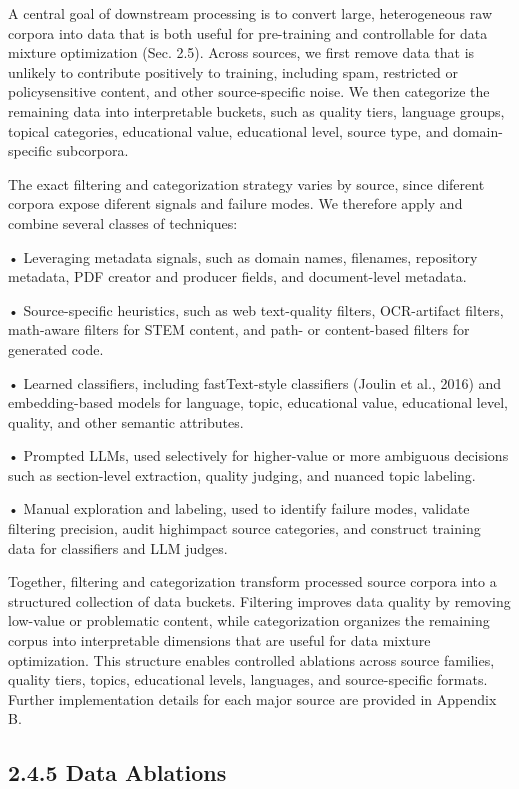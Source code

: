 \documentclass[
  10
]{article}
\begin{document}
A central goal of downstream processing is to convert large,
heterogeneous raw corpora into data that is both useful for pre-training
and controllable for data mixture optimization (Sec. 2.5). Across
sources, we first remove data that is unlikely to contribute positively
to training, including spam, restricted or policysensitive content, and
other source-specific noise. We then categorize the remaining data into
interpretable buckets, such as quality tiers, language groups, topical
categories, educational value, educational level, source type, and
domain-specific subcorpora.

The exact filtering and categorization strategy varies by source, since
diferent corpora expose diferent signals and failure modes. We therefore
apply and combine several classes of techniques:

• Leveraging metadata signals, such as domain names, filenames,
repository metadata, PDF creator and producer fields, and document-level
metadata.

• Source-specific heuristics, such as web text-quality filters,
OCR-artifact filters, math-aware filters for STEM content, and path- or
content-based filters for generated code.

• Learned classifiers, including fastText-style classifiers (Joulin et
al., 2016) and embedding-based models for language, topic, educational
value, educational level, quality, and other semantic attributes.

• Prompted LLMs, used selectively for higher-value or more ambiguous
decisions such as section-level extraction, quality judging, and nuanced
topic labeling.

• Manual exploration and labeling, used to identify failure modes,
validate filtering precision, audit highimpact source categories, and
construct training data for classifiers and LLM judges.

Together, filtering and categorization transform processed source
corpora into a structured collection of data buckets. Filtering improves
data quality by removing low-value or problematic content, while
categorization organizes the remaining corpus into interpretable
dimensions that are useful for data mixture optimization. This structure
enables controlled ablations across source families, quality tiers,
topics, educational levels, languages, and source-specific formats.
Further implementation details for each major source are provided in
Appendix B.

\subsection{2.4.5 Data Ablations}\label{data-ablations}
\end{document}
